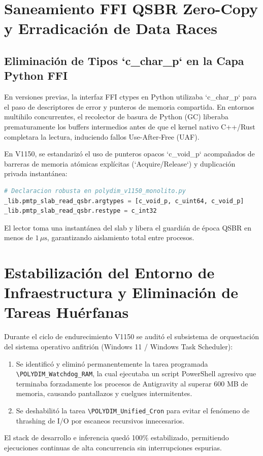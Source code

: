 \section{Saneamiento FFI QSBR Zero-Copy y Erradicación de Data Races}
\subsection{Eliminación de Tipos `c\_char\_p` en la Capa Python FFI}
En versiones previas, la interfaz FFI ctypes en Python utilizaba `c_char_p` para el paso de descriptores de error y punteros de memoria compartida. En entornos multihilo concurrentes, el recolector de basura de Python (GC) liberaba prematuramente los buffers intermedios antes de que el kernel nativo C++/Rust completara la lectura, induciendo fallos Use-After-Free (UAF).

En V1150, se estandarizó el uso de punteros opacos `c_void_p` acompañados de barreras de memoria atómicas explícitas (`Acquire/Release`) y duplicación privada instantánea:
\begin{lstlisting}[language=Python]
# Declaracion robusta en polydim_v1150_monolito.py
_lib.pmtp_slab_read_qsbr.argtypes = [c_void_p, c_uint64, c_void_p]
_lib.pmtp_slab_read_qsbr.restype = c_int32
\end{lstlisting}
El lector toma una instantánea del slab y libera el guardián de época QSBR en menos de $1\,\mu\text{s}$, garantizando aislamiento total entre procesos.

\section{Estabilización del Entorno de Infraestructura y Eliminación de Tareas Huérfanas}
Durante el ciclo de endurecimiento V1150 se auditó el subsistema de orquestación del sistema operativo anfitrión (Windows 11 / Windows Task Scheduler):
\begin{enumerate}
    \item Se identificó y eliminó permanentemente la tarea programada \texttt{\textbackslash POLYDIM\_Watchdog\_RAM}, la cual ejecutaba un script PowerShell agresivo que terminaba forzadamente los procesos de Antigravity al superar 600 MB de memoria, causando pantallazos y cuelgues intermitentes.
    \item Se deshabilitó la tarea \texttt{\textbackslash POLYDIM\_Unified\_Cron} para evitar el fenómeno de thrashing de I/O por escaneos recursivos innecesarios.
\end{enumerate}
El stack de desarrollo e inferencia quedó 100\% estabilizado, permitiendo ejecuciones continuas de alta concurrencia sin interrupciones espurias.

